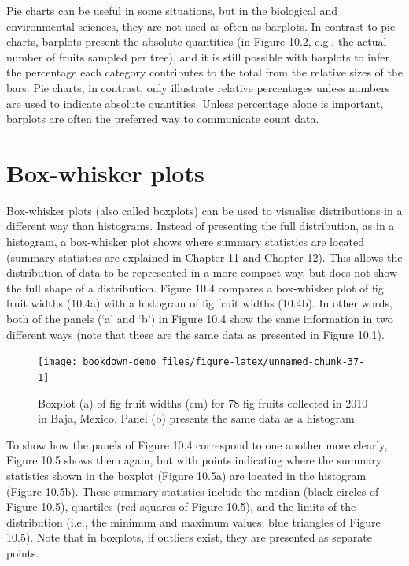 \documentclass[
]{scrbook}
\begin{document}
Pie charts can be useful in some situations, but in the biological and environmental sciences, they are not used as often as barplots.
In contrast to pie charts, barplots present the absolute quantities (in Figure 10.2, e.g., the actual number of fruits sampled per tree), and it is still possible with barplots to infer the percentage each category contributes to the total from the relative sizes of the bars.
Pie charts, in contrast, only illustrate relative percentages unless numbers are used to indicate absolute quantities.
Unless percentage alone is important, barplots are often the preferred way to communicate count data.

\hypertarget{box-whisker-plots}{%
\section{Box-whisker plots}\label{box-whisker-plots}}

Box-whisker plots (also called boxplots) can be used to visualise distributions in a different way than histograms.
Instead of presenting the full distribution, as in a histogram, a box-whisker plot shows where summary statistics are located (summary statistics are explained in \protect\hyperlink{Chapter_11}{Chapter 11} and \protect\hyperlink{Chapter_12}{Chapter 12}).
This allows the distribution of data to be represented in a more compact way, but does not show the full shape of a distribution.
Figure 10.4 compares a box-whisker plot of fig fruit widths (10.4a) with a histogram of fig fruit widths (10.4b).
In other words, both of the panels (`a' and `b') in Figure 10.4 show the same information in two different ways (note that these are the same data as presented in Figure 10.1).

\begin{figure}
\texttt{[image: bookdown-demo\_files/figure-latex/unnamed-chunk-37-1]} \caption{Boxplot (a) of fig fruit widths (cm) for 78 fig fruits collected in 2010 in Baja, Mexico. Panel (b) presents the same data as a histogram.}\label{fig:unnamed-chunk-37}
\end{figure}

To show how the panels of Figure 10.4 correspond to one another more clearly, Figure 10.5 shows them again, but with points indicating where the summary statistics shown in the boxplot (Figure 10.5a) are located in the histogram (Figure 10.5b).
These summary statistics include the median (black circles of Figure 10.5), quartiles (red squares of Figure 10.5), and the limits of the distribution (i.e., the minimum and maximum values; blue triangles of Figure 10.5).
Note that in boxplots, if outliers exist, they are presented as separate points.
\end{document}
